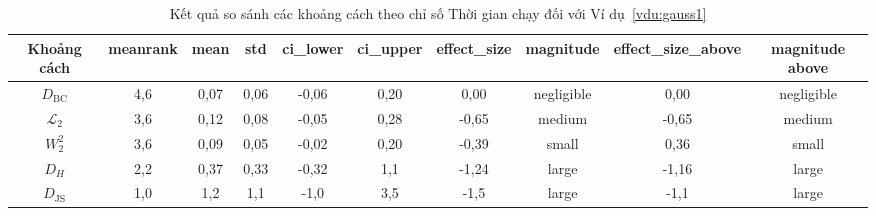 \documentclass[a4paper,oneside]{book} %
\theoremstyle{plain}
\theoremstyle{plain}
\theoremstyle{nonumberplain}
\begin{document}
\begin{spacing}{1.0}
\begin{landscape}
	
	\begin{table}[H]
		\centering
		\fontsize{11pt}{11pt}\selectfont
		\caption{Kết quả so sánh các khoảng cách theo chỉ số Thời gian chạy đối với Ví dụ~\ref{vdu:gauss1}}
		\begin{tabular}{cccccccccc}
			\toprule
			{Khoảng cách} & meanrank & mean & std & ci\_lower & ci\_upper & effect\_size & magnitude & effect\_size\_above & magnitude above \\
			\midrule
			$D_{\mathrm{BC}}$       & 4{,}6 & 0{,}07 & 0{,}06 & -0{,}06 & 0{,}20 &  0{,}00 & negligible &  0{,}00 & negligible \\
			$\mathcal{L}_2$         & 3{,}6 & 0{,}12 & 0{,}08 & -0{,}05 & 0{,}28 & -0{,}65 & medium     & -0{,}65 & medium \\
			$W^2_2$                 & 3{,}6 & 0{,}09 & 0{,}05 & -0{,}02 & 0{,}20 & -0{,}39 & small      &  0{,}36 & small \\
			$D_{H}$                 & 2{,}2 & 0{,}37 & 0{,}33 & -0{,}32 & 1{,}1  & -1{,}24 & large      & -1{,}16 & large \\
			$D_{\mathrm{JS}}$       & 1{,}0 & 1{,}2  & 1{,}1  & -1{,}0  & 3{,}5  & -1{,}5  & large      & -1{,}1  & large \\
			\bottomrule
		\end{tabular}
	\end{table}
	
\end{landscape}



\end{spacing}












\end{document}
